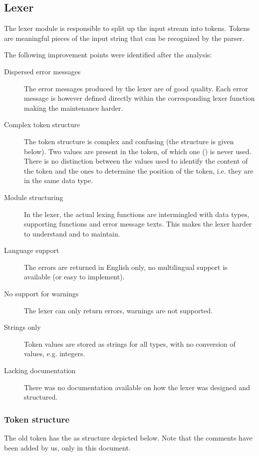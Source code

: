 
\subsection{Lexer}
\label{analysis:lexer}
The lexer module is responsible to split up the input stream into tokens.
Tokens are meaningful pieces of the input string that can be recognized by the parser.

The following improvement points were identified after the analysis:
\begin{description}
  \item[Dispersed error messages]
    The error messages produced by the lexer are of good quality.
    Each error message is however defined directly within the corresponding lexer function making the maintenance harder.
  \item[Complex token structure]
    The token structure is complex and confusing (the structure is given below).
    Two values are present in the token, of which one () is never used.
    There is no distinction between the values used to identify the content of the token and the ones to determine the position of the token, i.e. they are in the same data type.
  \item[Module structuring]
    In the lexer, the actual lexing functions are intermingled with data types, supporting functions and error message texts.
    This makes the lexer harder to understand and to maintain.
  \item[Language support]
    The errors are returned in English only, no multilingual support is available (or easy to implement).
  \item[No support for warnings]
    The lexer can only return errors, warnings are not supported.
  \item[Strings only]
    Token values are stored as strings for all types, with no conversion of values, e.g. integers.
  \item[Lacking documentation]
    There was no documentation available on how the lexer was designed and structured.
\end{description}

\subsubsection{Token structure}
\label{lexer-token}
The old token has the as structure depicted below.
Note that the comments have been added by us, only in this document.

